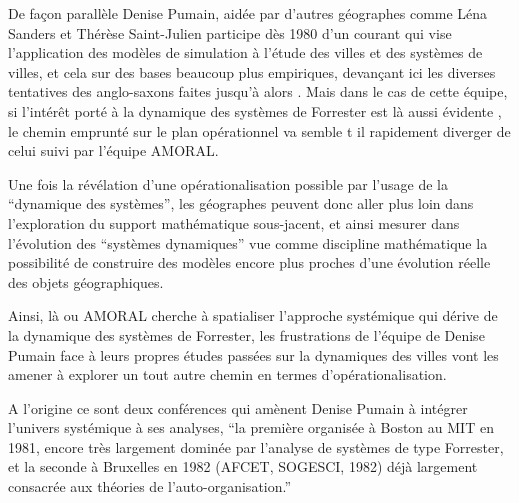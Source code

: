 
De façon parallèle Denise Pumain, aidée par d'autres géographes comme Léna Sanders et Thérèse Saint-Julien participe dès 1980 d'un courant \autocite{Pumain1983, Pumain1984, Pumain1989} qui vise l'application des modèles de simulation à l'étude des villes et des systèmes de villes, et cela sur des bases beaucoup plus empiriques, devançant ici les diverses tentatives des anglo-saxons faites jusqu'à alors \autocite[99-100]{Pumain1989}. Mais dans le cas de cette équipe, si l’intérêt porté à la dynamique des systèmes de Forrester est là aussi évidente \autocite{Pumain1983, Pumain1984}, le chemin emprunté sur le plan opérationnel va semble t il rapidement diverger de celui suivi par l'équipe AMORAL.

Une fois la révélation d'une opérationalisation possible par l'usage de la \enquote{dynamique des systèmes}, les géographes peuvent donc aller plus loin dans l'exploration du support mathématique sous-jacent, et ainsi mesurer dans l'évolution des \enquote{systèmes dynamiques} vue comme discipline mathématique la possibilité de construire des modèles encore plus proches d'une évolution réelle des objets géographiques.

Ainsi, là ou AMORAL cherche à spatialiser l'approche systémique qui dérive de la dynamique des systèmes de Forrester, les frustrations de l'équipe de Denise Pumain face à leurs propres études passées sur la dynamiques des villes vont les amener à explorer un tout autre chemin en termes d'opérationalisation.

A l'origine ce sont deux conférences qui amènent Denise Pumain à intégrer l'univers systémique à ses analyses, \enquote{la première organisée à Boston au MIT en 1981, encore très largement dominée par l’analyse de systèmes de type Forrester, et la seconde à Bruxelles en 1982 (AFCET, SOGESCI, 1982) déjà largement consacrée aux théories de l’auto-organisation.} \textcite[27]{Pumain2003} \autocites[27]{Pumain2003}{Schmid2014}


